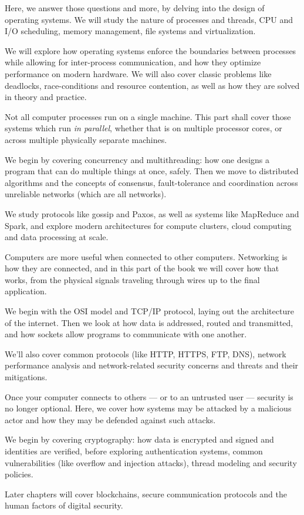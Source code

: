 \begin{itemize}
  Here, we answer those questions and more, by delving into the design of
  operating systems. We will study the nature of processes and threads, CPU
  and I/O scheduling, memory management, file systems and virtualization.

  We will explore how operating systems enforce the boundaries between
  processes while allowing for inter-process communication, and how they
  optimize performance on modern hardware. We will also cover classic
  problems like deadlocks, race-conditions and resource contention, as well
  as how they are solved in theory and practice.

  Not all computer processes run on a single machine.
  This part shall cover those systems which run \emph{in parallel}, whether
  that is on multiple processor cores, or across multiple physically separate
  machines.

  We begin by covering concurrency and multithreading: how one designs a program
  that can do multiple things at once, safely. Then we move to distributed
  algorithms and the concepts of consensus, fault-tolerance and coordination
  across unreliable networks (which are all networks).

  We study protocols like gossip and Paxos, as well as systems like MapReduce
  and Spark, and explore modern architectures for compute clusters, cloud
  computing and data processing at scale.

  Computers are more useful when connected to other computers.
  Networking is how they are connected, and in this part of the book we will
  cover how that works, from the physical signals traveling through wires up to
  the final application.

  We begin with the OSI model and TCP/IP protocol, laying out the architecture
  of the internet. Then we look at how data is addressed, routed and
  transmitted, and how sockets allow programs to communicate with one another.

  We'll also cover common protocols (like HTTP, HTTPS, FTP, DNS), network
  performance analysis and network-related security concerns and threats
  and their mitigations.

  Once your computer connects to others --- or to an untrusted user --- security
  is no longer optional. Here, we cover how systems may be attacked by a
  malicious actor and how they may be defended against such attacks.

  We begin by covering cryptography: how data is encrypted and signed and
  identities are verified, before exploring authentication systems, common
  vulnerabilities (like overflow and injection attacks), thread modeling and
  security policies.

  Later chapters will cover blockchains, secure communication protocols and the
  human factors of digital security.
\end{itemize}

